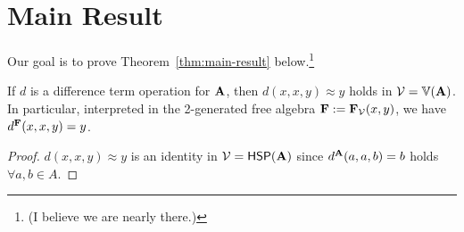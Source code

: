 
\section{Main Result}
Our goal is to prove Theorem~\ref{thm:main-result} below.\footnote{(I believe we are nearly there.)}
\begin{lemma}
  If $d$ is a difference term operation for $\mathbf{A}$,
  then $d(x,x,y) \approx y$ holds in $\mathcal{V} = \operatorname{\mathbb{V}}(\mathbf{A})$.
  In particular, interpreted in the 2-generated free algebra
  $\mathbf{F} := \mathbf{F}_{\mathcal{V}}(x,y)$, we have $d^{\mathbf{F}}(x,x,y) = y$.
\end{lemma}
\begin{proof}
  $d(x,x,y) \approx y$ is an identity in
  $\mathcal{V} = \mathsf{H} \mathsf{S} \mathsf{P}(\mathbf{A})$ since 
  $d^{\mathbf{A}}(a,a,b) = b$ holds $\forall a, b \in A$.
\end{proof}


